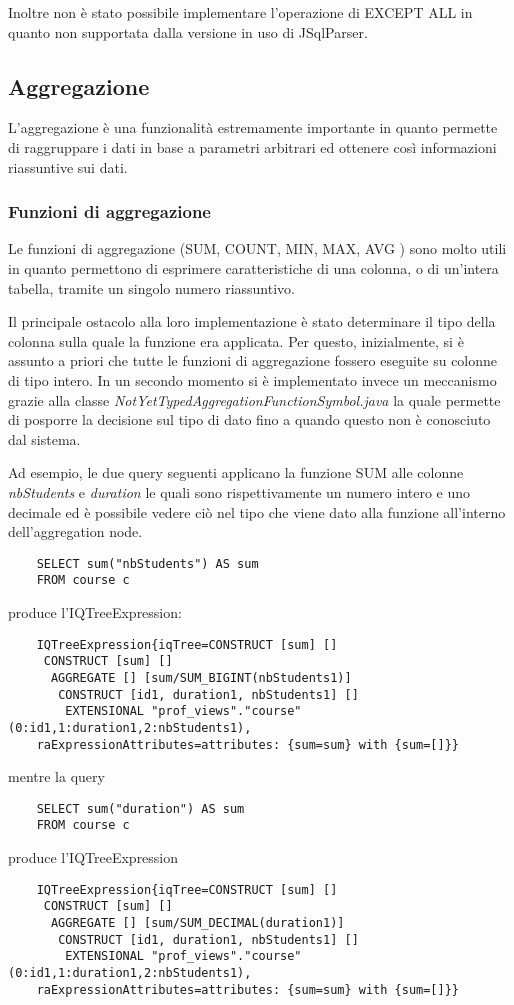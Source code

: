 Inoltre non è stato possibile implementare l'operazione di EXCEPT ALL in quanto non supportata dalla versione in uso di JSqlParser.

\subsection{Aggregazione}
L'aggregazione è una funzionalità estremamente importante in quanto permette di raggruppare i dati in base a parametri arbitrari ed
ottenere così informazioni riassuntive sui dati.
\subsubsection*{Funzioni di aggregazione}
Le funzioni di aggregazione (SUM, COUNT, MIN, MAX, AVG ) sono molto utili in quanto permettono di esprimere caratteristiche di una colonna, 
o di un'intera tabella, tramite un singolo numero riassuntivo.

Il principale ostacolo alla loro implementazione è stato determinare il tipo della colonna sulla quale la funzione era applicata.
Per questo, inizialmente, si è assunto a priori che tutte le funzioni di aggregazione fossero eseguite su colonne di tipo intero. In un
secondo momento si è implementato invece un meccanismo grazie alla classe \textit{NotYetTypedAggregationFunctionSymbol.java} la quale 
permette di posporre la decisione sul tipo di dato fino a quando questo non è conosciuto dal sistema.

Ad esempio, le due query seguenti applicano la funzione SUM alle colonne \textit{nbStudents} e \textit{duration} le quali sono rispettivamente 
un numero intero e uno decimale ed è possibile vedere ciò nel tipo che viene dato alla funzione all'interno dell'aggregation node.
\begin{verbatim}
    SELECT sum("nbStudents") AS sum
    FROM course c 
\end{verbatim}
produce l'IQTreeExpression:
\begin{verbatim}
    IQTreeExpression{iqTree=CONSTRUCT [sum] []
     CONSTRUCT [sum] []
      AGGREGATE [] [sum/SUM_BIGINT(nbStudents1)]
       CONSTRUCT [id1, duration1, nbStudents1] []
        EXTENSIONAL "prof_views"."course"(0:id1,1:duration1,2:nbStudents1),
    raExpressionAttributes=attributes: {sum=sum} with {sum=[]}}
\end{verbatim}
mentre la query
\begin{verbatim}
    SELECT sum("duration") AS sum
    FROM course c 
\end{verbatim}
produce l'IQTreeExpression
\begin{verbatim}
    IQTreeExpression{iqTree=CONSTRUCT [sum] []
     CONSTRUCT [sum] []
      AGGREGATE [] [sum/SUM_DECIMAL(duration1)]
       CONSTRUCT [id1, duration1, nbStudents1] []
        EXTENSIONAL "prof_views"."course"(0:id1,1:duration1,2:nbStudents1),
    raExpressionAttributes=attributes: {sum=sum} with {sum=[]}}    
\end{verbatim}

